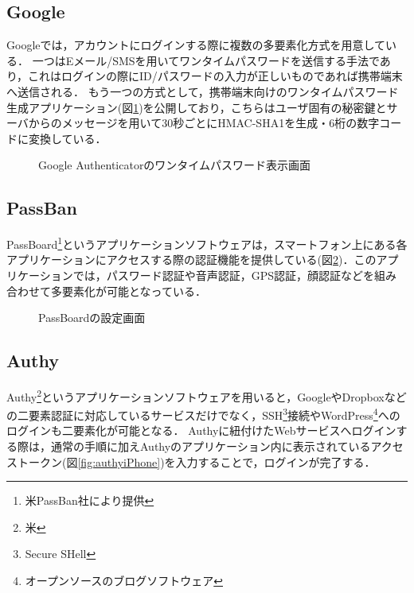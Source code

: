 \subsection{Google}
Googleでは，アカウントにログインする際に複数の多要素化方式を用意している．
一つはEメール/SMSを用いてワンタイムパスワードを送信する手法であり，これはログインの際にID/パスワードの入力が正しいものであれば携帯端末へ送信される．
もう一つの方式として，携帯端末向けのワンタイムパスワード生成アプリケーション(図\ref{fig:googleAuthenticator})を公開しており，こちらはユーザ固有の秘密鍵とサーバからのメッセージを用いて30秒ごとにHMAC-SHA1を生成・6桁の数字コードに変換している．

\begin{figure}[ht]
\begin{center}
\end{center}
\caption{Google Authenticatorのワンタイムパスワード表示画面}
\label{fig:googleAuthenticator}
\end{figure}

\subsection{PassBan}
PassBoard\footnote{米PassBan社により提供}というアプリケーションソフトウェアは，スマートフォン上にある各アプリケーションにアクセスする際の認証機能を提供している(図\ref{fig:passboard})．このアプリケーションでは，パスワード認証や音声認証，GPS認証，顔認証などを組み合わせて多要素化が可能となっている．

\begin{figure}[ht]
\begin{center}
\end{center}
\caption{PassBoardの設定画面}
\label{fig:passboard}
\end{figure}

\subsection{Authy}
Authy\footnote{米}というアプリケーションソフトウェアを用いると，GoogleやDropboxなどの二要素認証に対応しているサービスだけでなく，SSH\footnote{Secure SHell}接続やWordPress\footnote{オープンソースのブログソフトウェア}へのログインも二要素化が可能となる．
Authyに紐付けたWebサービスへログインする際は，通常の手順に加えAuthyのアプリケーション内に表示されているアクセストークン(図\ref{fig:authyiPhone})を入力することで，ログインが完了する．

